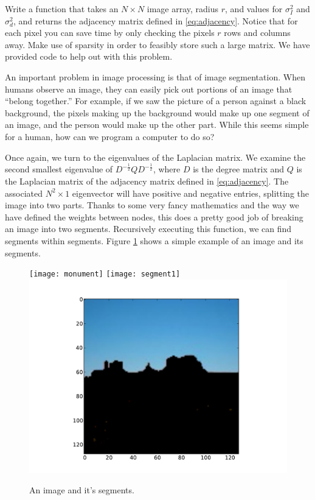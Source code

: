 \begin{problem}
Write a function  that takes an $N \times N$ image array, radius $r$, and values for
$\sigma_I^2$ and $\sigma_d^2$, and returns the adjacency matrix defined in \eqref{eq:adjacency}.
Notice that for each pixel you can save time by only checking the pixels $r$ rows and columns away.
Make use of sparsity in order to feasibly store such a large matrix.
We have provided code to help out with this problem.
\end{problem}

An important problem in image processing is that of image segmentation.
When humans observe an image, they can easily pick out portions of an image that ``belong together.''
For example, if we saw the picture of a person against a black background, the pixels making up the background would make up one segment of an image, and the person would make up the other part.
While this seems simple for a human, how can we program a computer to do so?

Once again, we turn to the eigenvalues of the Laplacian matrix.
We examine the second smallest eigenvalue of $D^{-\frac{1}{2}}QD^{-\frac{1}{2}}$, where $D$ is the degree matrix and $Q$ is the Laplacian matrix of the adjacency matrix defined in \eqref{eq:adjacency}.
The associated $N^2 \times 1$ eigenvector will have positive and negative entries, splitting the image into two parts.
Thanks to some very fancy mathematics and the way we have defined the weights between nodes, this does a pretty good job of breaking an image into two segments.
Recursively executing this function, we can find segments within segments.
Figure \ref{segmentation:example} shows a simple example of an image and its segments.

\begin{figure}
\texttt{[image: monument]}
\texttt{[image: segment1]}
\includegraphics[scale=0.2]{segment2}
\caption{An image and it's segments.}
\label{segmentation:example}
\end{figure}

